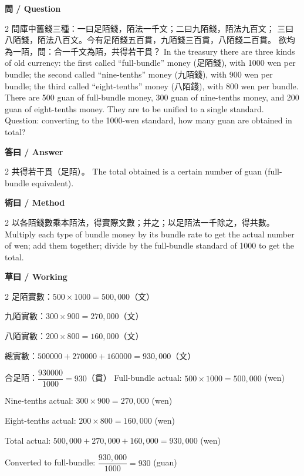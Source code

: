 \documentclass[11pt,a4paper]{article}
\begin{document}
\vspace{0.4em}
\noindent\textbf{\textcolor{chinesecolor}{問} / \textcolor{englishcolor}{Question}}
\vspace{0.3em}
\begin{paracol}{2}
問庫中舊錢三種：一曰足陌錢，陌法一千文；二曰九陌錢，陌法九百文；
三曰八陌錢，陌法八百文。今有足陌錢五百貫，九陌錢三百貫，八陌錢二百貫。
欲均為一陌，問：合一千文為陌，共得若干貫？
\switchcolumn
In the treasury there are three kinds of old currency: the first called
``full-bundle'' money (足陌錢), with 1000 wen per bundle; the second called
``nine-tenths'' money (九陌錢), with 900 wen per bundle; the third called
``eight-tenths'' money (八陌錢), with 800 wen per bundle. There are 500 guan
of full-bundle money, 300 guan of nine-tenths money, and 200 guan of
eight-tenths money. They are to be unified to a single standard. Question:
converting to the 1000-wen standard, how many guan are obtained in total?
\end{paracol}

\vspace{0.4em}
\noindent\textbf{\textcolor{chinesecolor}{答曰} / \textcolor{englishcolor}{Answer}}
\vspace{0.2em}
\begin{paracol}{2}
共得若干貫（足陌）。
\switchcolumn
The total obtained is a certain number of guan (full-bundle equivalent).
\end{paracol}

\vspace{0.4em}
\noindent\textbf{\textcolor{chinesecolor}{術曰} / \textcolor{englishcolor}{Method}}
\vspace{0.2em}
\begin{paracol}{2}
以各陌錢數乘本陌法，得實際文數；并之；以足陌法一千除之，得共數。
\switchcolumn
Multiply each type of bundle money by its bundle rate to get the actual
number of wen; add them together; divide by the full-bundle standard of 1000
to get the total.
\end{paracol}

\vspace{0.4em}
\noindent\textbf{\textcolor{chinesecolor}{草曰} / \textcolor{englishcolor}{Working}}
\vspace{0.2em}
\begin{paracol}{2}
足陌實數：$500 \times 1000 = 500{,}000$（文）

九陌實數：$300 \times 900 = 270{,}000$（文）

八陌實數：$200 \times 800 = 160{,}000$（文）

總實數：$500000 + 270000 + 160000 = 930{,}000$（文）

合足陌：$\dfrac{930000}{1000} = 930$（貫）
\switchcolumn
Full-bundle actual: $500 \times 1000 = 500{,}000$ (wen)

Nine-tenths actual: $300 \times 900 = 270{,}000$ (wen)

Eight-tenths actual: $200 \times 800 = 160{,}000$ (wen)

Total actual: $500{,}000 + 270{,}000 + 160{,}000 = 930{,}000$ (wen)

Converted to full-bundle: $\dfrac{930{,}000}{1000} = 930$ (guan)
\end{paracol}
\end{document}
